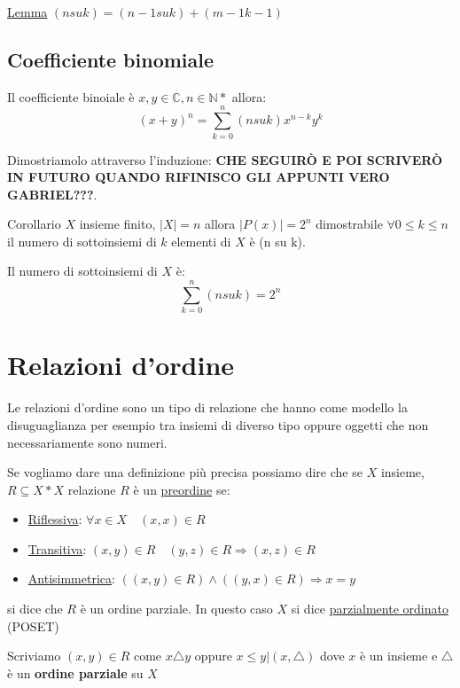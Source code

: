\documentclass{article}
\begin{document}
\underline{Lemma} $(n su k) = (n-1 su k) + (m-1 k-1)$ 


\subsection{Coefficiente binomiale}
Il coefficiente binoiale è $x,y \in \mathbb{C}, n \in \mathbb{N}*$ allora:
\begin{equation*}
        {(x+y)}^{n} = \sum_{k=0}^{n}(n su k)x^{n-k}y^k
\end{equation*}

Dimostriamolo attraverso l'induzione: \newline
\textbf{CHE SEGUIRÒ E POI SCRIVERÒ IN FUTURO QUANDO RIFINISCO GLI APPUNTI VERO GABRIEL???}.


Corollario $X$ insieme finito, $|X| = n$ allora $|P(x)| = 2^n$ dimostrabile $\forall 0 \le k \le n$ il numero di sottoinsiemi di $k$ elementi di $X$ è (n su k). \par
Il numero di sottoinsiemi di $X$ è: 
\begin{equation*}
        \sum_{k=0}^{n}(n su k) = 2^n
\end{equation*}




\newpage
\section{Relazioni d'ordine}
Le relazioni d'ordine sono un tipo di relazione che hanno come modello la disuguaglianza per esempio tra insiemi di diverso tipo oppure oggetti che non necessariamente sono numeri. \par
Se vogliamo dare una definizione più precisa possiamo dire che se $ X $  insieme, $ R \subseteq X * X $ relazione $ R $ è un \underline{preordine} se:
\begin{itemize}
        \item \underline{Riflessiva}: $ \forall x \in X \quad (x,x) \in R$ 
        \item \underline{Transitiva}: $ (x,y) \in R \quad (y,z)  \in R \Rightarrow (x,z) \in R$ 
        \item \underline{Antisimmetrica}: $ ((x,y) \in R) \land ((y,x) \in R) \Rightarrow x = y $ 
\end{itemize}

si dice che $ R $ è un ordine parziale. \newline
In questo caso $ X $ si dice \underline{parzialmente ordinato} (POSET) \par
Scriviamo $ (x,y) \in R $ come $ x \triangle y $ oppure $ x \le y | (x, \triangle)$  dove $x$ è un insieme e $ \triangle $ è un \textbf{ordine parziale} su $ X $    
\end{document}
